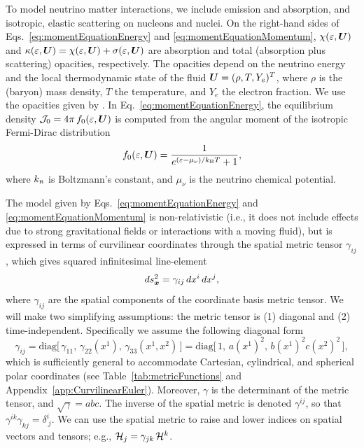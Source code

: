 \documentclass[10pt,preprint]{aastex}
\begin{document}
To model neutrino matter interactions, we include emission and absorption, and isotropic, elastic scattering on nucleons and nuclei.  
On the right-hand sides of Eqs.~\eqref{eq:momentEquationEnergy} and \eqref{eq:momentEquationMomentum}, $\chi(\varepsilon,\boldsymbol{U})$ and $\kappa(\varepsilon,\boldsymbol{U})=\chi(\varepsilon,\boldsymbol{U})+\sigma(\varepsilon,\boldsymbol{U})$ are absorption and total (absorption plus scattering) opacities, respectively.  
The opacities depend on the neutrino energy and the local thermodynamic state of the fluid $\boldsymbol{U}=(\rho,T,Y_{e})^{T}$, where $\rho$ is the (baryon) mass density, $T$ the temperature, and $Y_{e}$ the electron fraction.  
We use the opacities given by \citet{bruenn_1985}.  
In Eq.~\eqref{eq:momentEquationEnergy}, the equilibrium density $\mathcal{J}_{0}=4\pi\,f_{0}(\varepsilon,\boldsymbol{U})$ is computed from the angular moment of the isotropic Fermi-Dirac distribution
\begin{equation}
  f_{0}(\varepsilon,\boldsymbol{U})=\frac{1}{e^{(\varepsilon-\mu_{\nu})/k_{\mbox{\tiny B}}T}+1},
\end{equation}
where $k_{\mbox{\tiny B}}$ is Boltzmann's constant, and $\mu_{\nu}$ is the neutrino chemical potential.  

The model given by Eqs.~\eqref{eq:momentEquationEnergy} and \eqref{eq:momentEquationMomentum} is non-relativistic (i.e., it does not include effects due to strong gravitational fields or interactions with a moving fluid), but is expressed in terms of curvilinear coordinates through the spatial metric tensor $\gamma_{ij}$, which gives squared infinitesimal line-element
\begin{equation}
  ds_{\boldsymbol{x}}^{2}=\gamma_{ij}\,dx^{i}\,dx^{j},
\end{equation}
where $\gamma_{ij}$ are the spatial components of the coordinate basis metric tensor.  
We will make two simplifying assumptions: the metric tensor is (1) diagonal and (2) time-independent.  
Specifically we assume the following diagonal form
\begin{equation}
  \gamma_{ij}
  =\mbox{diag}\big[\,\gamma_{11},\,\gamma_{22}(x^{1}),\,\gamma_{33}(x^{1},x^{2})\,\big]
  =\mbox{diag}\big[\,1,\,a(x^{1})^{2},\,b(x^{1})^{2}c(x^{2})^{2}\,\big], 
  \label{eq:threeMetric}
\end{equation}
which is sufficiently general to accommodate Cartesian, cylindrical, and spherical polar coordinates (see Table~\ref{tab:metricFunctions} and Appendix~\ref{app:CurvilinearEuler}).  
Moreover, $\gamma$ is the determinant of the metric tensor, and $\sqrt{\gamma}=abc$.  
The inverse of the spatial metric is denoted $\gamma^{ij}$, so that $\gamma^{ik}\gamma_{kj}=\delta^{i}_{~j}$.  
We can use the spatial metric to raise and lower indices on spatial vectors and tensors; e.g., $\mathcal{H}_{j}=\gamma_{jk}\,\mathcal{H}^{k}$.  
\end{document}
